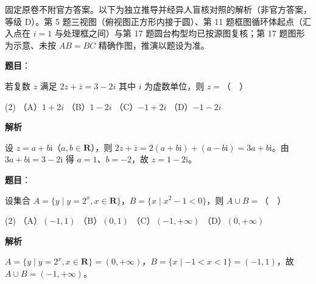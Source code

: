 

\begin{gktip}
固定原卷不附官方答案。以下为独立推导并经异人盲核对照的解析（非官方答案，等级 D）。第 5 题三视图（俯视图正方形内接于圆）、第 11 题框图循环体起点（汇入点在 \(i=1\) 与处理框之间）与第 17 题圆台构型均已按源图复核；第 17 题图形为示意、未按 \(AB=BC\) 精确作图，推演以题设为准。
\end{gktip}

\begin{answer}

\textbf{题目}：

若复数 \(z\) 满足 \(2z+\overline{z}=3-2i\) 其中 \(i\) 为虚数单位，则 \(z=\)（　）

\begin{gkopts}(2)
\task （A）\(1+2i\)
\task （B）\(1-2i\)
\task （C）\(-1+2i\)
\task （D）\(-1-2i\)
\end{gkopts}

\textbf{解析}

设 \(z=a+b\mathrm{i}\)（\(a,b\in\mathbf{R}\)），则 \(2z+\overline{z}=2(a+b\mathrm{i})+(a-b\mathrm{i})=3a+b\mathrm{i}\)。由 \(3a+b\mathrm{i}=3-2\mathrm{i}\) 得 \(a=1\)、\(b=-2\)，故 \(z=1-2\mathrm{i}\)。


\end{answer}
\begin{answer}

\textbf{题目}：

设集合 \(A=\{y\mid y=2^{x},x\in\mathbf{R}\}\)，\(B=\{x\mid x^{2}-1<0\}\)，则 \(A\cup B=\)（　）

\begin{gkopts}(2)
\task （A）\((-1,1)\)
\task （B）\((0,1)\)
\task （C）\((-1,+\infty)\)
\task （D）\((0,+\infty)\)
\end{gkopts}

\textbf{解析}

\(A=\{y\mid y=2^{x},x\in\mathbf{R}\}=(0,+\infty)\)，\(B=\{x\mid -1<x<1\}=(-1,1)\)，故 \(A\cup B=(-1,+\infty)\)。


\end{answer}
